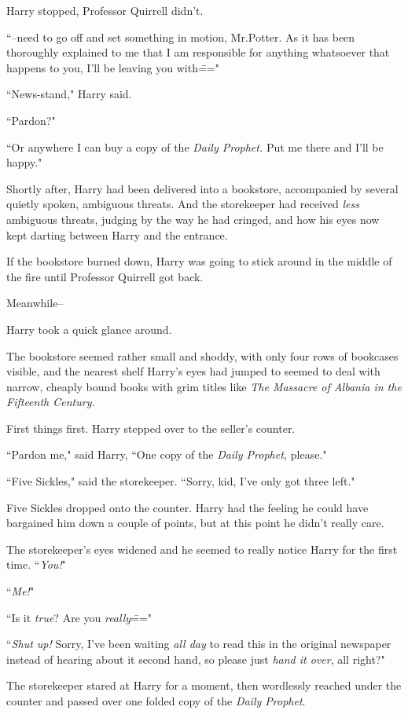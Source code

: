 Harry stopped, Professor Quirrell didn't.

``\---need to go off and set something in motion, Mr.\?Potter. As it has been thoroughly explained to me that I am responsible for anything whatsoever that happens to you, I'll be leaving you with\==="

``News-stand," Harry said.

``Pardon?"

``Or anywhere I can buy a copy of the \emph{Daily Prophet.} Put me there and I'll be happy."

Shortly after, Harry had been delivered into a bookstore, accompanied by several quietly spoken, ambiguous threats. And the storekeeper had received \emph{less} ambiguous threats, judging by the way he had cringed, and how his eyes now kept darting between Harry and the entrance.

If the bookstore burned down, Harry was going to stick around in the middle of the fire until Professor Quirrell got back.

Meanwhile\---

Harry took a quick glance around.

The bookstore seemed rather small and shoddy, with only four rows of bookcases visible, and the nearest shelf Harry's eyes had jumped to seemed to deal with narrow, cheaply bound books with grim titles like \emph{The Massacre of Albania in the Fifteenth Century.}

First things first. Harry stepped over to the seller's counter.

``Pardon me," said Harry, ``One copy of the \emph{Daily Prophet,} please."

``Five Sickles," said the storekeeper. ``Sorry, kid, I've only got three left."

Five Sickles dropped onto the counter. Harry had the feeling he could have bargained him down a couple of points, but at this point he didn't really care.

The storekeeper's eyes widened and he seemed to really notice Harry for the first time. ``\emph{You!}"

``\emph{Me!}"

``Is it \emph{true}? Are you \emph{really}\==="

``\emph{Shut up!} Sorry, I've been waiting \emph{all day} to read this in the original newspaper instead of hearing about it second hand, so please just \emph{hand it over}, all right?"

The storekeeper stared at Harry for a moment, then wordlessly reached under the counter and passed over one folded copy of the \emph{Daily Prophet}.

